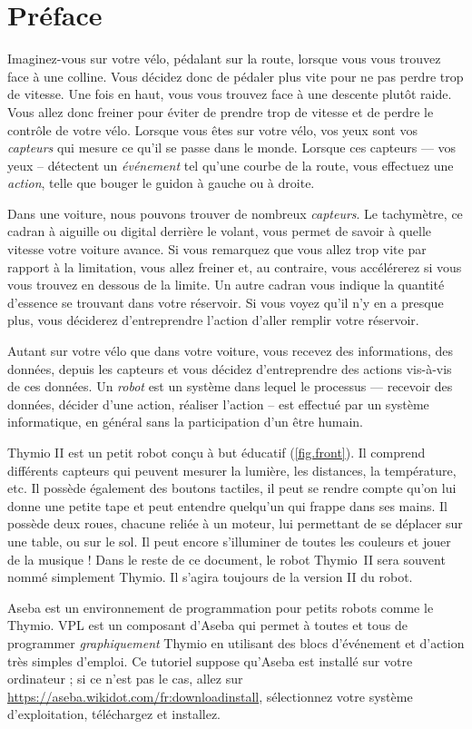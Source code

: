 \thispagestyle{empty}
\chapter*{Préface}


Imaginez-vous sur votre vélo, pédalant sur la route, lorsque vous vous trouvez face à une colline. Vous décidez donc de pédaler plus vite pour ne pas perdre trop de vitesse. Une fois en haut, vous vous trouvez face à une descente plutôt raide. Vous allez donc freiner pour éviter de prendre trop de vitesse et de perdre le contrôle de votre vélo.
Lorsque vous êtes sur votre vélo, vos yeux sont vos \textit{capteurs} qui mesure ce qu'il se passe dans le monde.
Lorsque ces capteurs --- vos yeux -- détectent un \textit{événement} tel qu'une courbe de la route, vous effectuez une \textit{action}, telle que bouger le guidon à gauche ou à droite.

Dans une voiture, nous pouvons trouver de nombreux \textit{capteurs}. Le tachymètre, ce cadran à aiguille ou digital derrière le volant, vous permet de savoir à quelle vitesse votre voiture avance. Si vous remarquez que vous allez trop vite par rapport à la limitation, vous allez freiner et, au contraire, vous accélérerez si vous vous trouvez en dessous de la limite. Un autre cadran vous indique la quantité d'essence se trouvant dans votre réservoir. Si vous voyez qu'il n'y en a presque plus, vous déciderez d'entreprendre l'action d'aller remplir votre réservoir.
 
Autant sur votre vélo que dans votre voiture, vous recevez des informations, des données, depuis les capteurs et vous décidez d'entreprendre des actions vis-à-vis de ces données. Un \textit{robot} est un système dans lequel le processus --- recevoir des données, décider d'une action, réaliser l'action -- est effectué par un système informatique, en général sans la participation d'un être humain.


Thymio II est un petit robot conçu à but éducatif (\cref{fig.front}).
Il comprend différents capteurs qui peuvent mesurer la lumière, les distances, la température, etc.
Il possède également des boutons tactiles, il peut se rendre compte qu'on lui donne une petite tape et peut entendre quelqu'un qui frappe dans ses mains.
Il possède deux roues, chacune reliée à un moteur, lui permettant de se déplacer sur une table, ou sur le sol.
Il peut encore s'illuminer de toutes les couleurs et jouer de la musique !
Dans le reste de ce document, le robot Thymio~II sera souvent nommé simplement Thymio.
Il s'agira toujours de la version II du robot.

Aseba est un environnement de programmation pour petits robots comme le Thymio.
VPL est un composant d'Aseba qui permet à toutes et tous de programmer \textit{graphiquement} Thymio en utilisant des blocs d'événement et d'action très simples d'emploi.
Ce tutoriel suppose qu'Aseba est installé sur votre ordinateur ; si ce n'est pas le cas, allez sur \url{https://aseba.wikidot.com/fr:downloadinstall}, sélectionnez votre système d'exploitation, téléchargez et installez.
